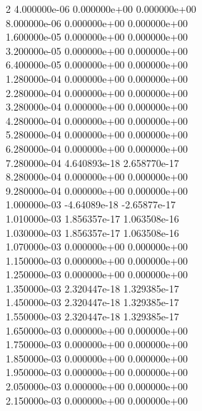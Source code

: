 2	4.000000e-06	0.000000e+00	0.000000e+00	\\ 	8.000000e-06	0.000000e+00	0.000000e+00	\\ 	1.600000e-05	0.000000e+00	0.000000e+00	\\ 	3.200000e-05	0.000000e+00	0.000000e+00	\\ 	6.400000e-05	0.000000e+00	0.000000e+00	\\ 	1.280000e-04	0.000000e+00	0.000000e+00	\\ 	2.280000e-04	0.000000e+00	0.000000e+00	\\ 	3.280000e-04	0.000000e+00	0.000000e+00	\\ 	4.280000e-04	0.000000e+00	0.000000e+00	\\ 	5.280000e-04	0.000000e+00	0.000000e+00	\\ 	6.280000e-04	0.000000e+00	0.000000e+00	\\ 	7.280000e-04	4.640893e-18	2.658770e-17	\\ 	8.280000e-04	0.000000e+00	0.000000e+00	\\ 	9.280000e-04	0.000000e+00	0.000000e+00	\\ 	1.000000e-03	-4.64089e-18	-2.65877e-17	\\ 	1.010000e-03	1.856357e-17	1.063508e-16	\\ 	1.030000e-03	1.856357e-17	1.063508e-16	\\ 	1.070000e-03	0.000000e+00	0.000000e+00	\\ 	1.150000e-03	0.000000e+00	0.000000e+00	\\ 	1.250000e-03	0.000000e+00	0.000000e+00	\\ 	1.350000e-03	2.320447e-18	1.329385e-17	\\ 	1.450000e-03	2.320447e-18	1.329385e-17	\\ 	1.550000e-03	2.320447e-18	1.329385e-17	\\ 	1.650000e-03	0.000000e+00	0.000000e+00	\\ 	1.750000e-03	0.000000e+00	0.000000e+00	\\ 	1.850000e-03	0.000000e+00	0.000000e+00	\\ 	1.950000e-03	0.000000e+00	0.000000e+00	\\ 	2.050000e-03	0.000000e+00	0.000000e+00	\\ 	2.150000e-03	0.000000e+00	0.000000e+00	\\ \hline
